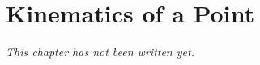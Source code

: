 \chapter{Kinematics of a Point}\label{ch:b1:point-kinematics}


\emph{This chapter has not been written yet.}
